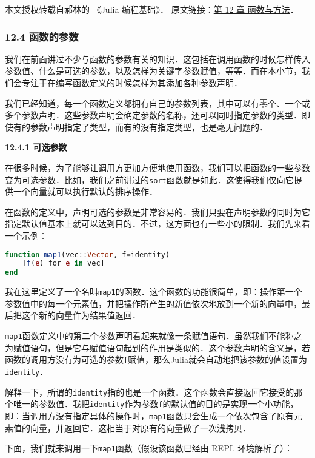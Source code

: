 
本文授权转载自郝林的 《Julia 编程基础》． 原文链接：\href{https://github.com/hyper0x/JuliaBasics/blob/master/book/ch12.md}{第 12 章 函数与方法}．

\subsubsection{12.4 函数的参数}

我们在前面讲过不少与函数的参数有关的知识．这包括在调用函数的时候怎样传入参数值、什么是可选的参数，以及怎样为关键字参数赋值，等等．而在本小节，我们会专注于在编写函数定义的时候怎样为其添加各种参数声明．

我们已经知道，每一个函数定义都拥有自己的参数列表，其中可以有零个、一个或多个参数声明．这些参数声明会确定参数的名称，还可以同时指定参数的类型．即使有的参数声明指定了类型，而有的没有指定类型，也是毫无问题的．

\textbf{12.4.1 可选参数}

在很多时候，为了能够让调用方更加方便地使用函数，我们可以把函数的一些参数变为可选参数．比如，我们之前讲过的\verb|sort|函数就是如此．这使得我们仅向它提供一个向量就可以执行默认的排序操作．

在函数的定义中，声明可选的参数是非常容易的．我们只要在声明参数的同时为它指定默认值基本上就可以达到目的．不过，这方面也有一些小的限制．我们先来看一个示例：

\begin{lstlisting}[language=julia]
function map1(vec::Vector, f=identity)
    [f(e) for e in vec]
end
\end{lstlisting}

我在这里定义了一个名叫\verb|map1|的函数．这个函数的功能很简单，即：操作第一个参数值中的每一个元素值，并把操作所产生的新值依次地放到一个新的向量中，最后把这个新的向量作为结果值返回．

\verb|map1|函数定义中的第二个参数声明看起来就像一条赋值语句．虽然我们不能称之为赋值语句，但是它与赋值语句起到的作用是类似的．这个参数声明的含义是，若函数的调用方没有为可选的参数\verb|f|赋值，那么Julia就会自动地把该参数的值设置为\verb|identity|．

解释一下，所谓的\verb|identity|指的也是一个函数．这个函数会直接返回它接受的那个唯一的参数值．我把\verb|identity|作为参数\verb|f|的默认值的目的是实现一个小功能，即：当调用方没有指定具体的操作时，\verb|map1|函数只会生成一个依次包含了原有元素值的向量，并返回它．这相当于对原有的向量做了一次浅拷贝．

下面，我们就来调用一下\verb|map1|函数（假设该函数已经由 REPL 环境解析了）：

